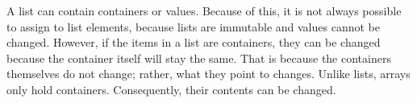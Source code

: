 \documentclass[14pt,english]{extarticle}
\begin{document}
A list can contain containers or values. Because of this, it is not
always possible to assign to list elements, because lists are immutable
and values cannot be changed. However, if the items in a list are
containers, they can be changed because the container itself will
stay the same. That is because the containers themselves do not change;
rather, what they point to changes. Unlike lists, arrays only hold
containers. Consequently, their contents can be changed. 

\newpage{}
\nocite{*}

\end{document}
